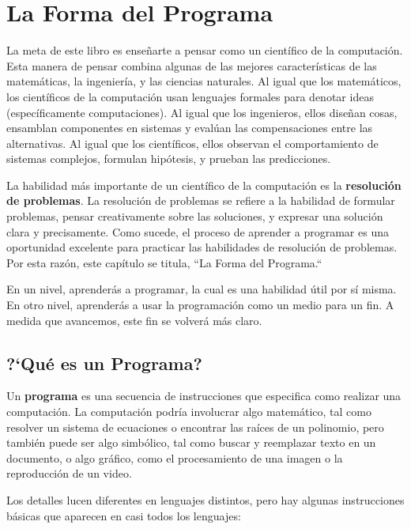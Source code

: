 \chapter{La Forma del Programa}

La meta de este libro es enseñarte a pensar como un científico de la 
computación. Esta manera de pensar combina algunas de las mejores características
de las matemáticas, la ingeniería, y las ciencias naturales. Al igual que los
matemáticos, los científicos de la computación usan lenguajes formales para denotar
ideas (específicamente computaciones). Al igual que los ingenieros, ellos diseñan cosas,
ensamblan componentes en sistemas y evalúan las compensaciones entre las alternativas.
Al igual que los científicos, ellos observan el comportamiento de sistemas complejos, 
formulan hipótesis, y prueban las predicciones. 

La habilidad más importante de un científico de la computación
es la {\bf resolución de problemas}. La resolución de problemas se refiere
a la habilidad de formular problemas, pensar creativamente sobre las
soluciones, y expresar una solución clara y precisamente. Como sucede, 
el proceso de aprender a programar es una oportunidad excelente para practicar 
las habilidades de resolución de problemas. Por esta razón, este capítulo se titula,
 ``La Forma del Programa.``

En un nivel, aprenderás a programar, la cual es una habilidad útil por sí misma.
En otro nivel, aprenderás a usar la programación como un medio para un fin. 
A medida que avancemos, este fin se volverá más claro.


\section{?`Qué es un Programa?}

Un {\bf programa} es una secuencia de instrucciones que especifica
como realizar una computación. La computación podría involucrar 
algo matemático, tal como resolver un sistema de ecuaciones o 
encontrar las raíces de un polinomio, pero también puede ser algo
simbólico, tal como buscar y reemplazar texto en un documento, o 
algo gráfico, como el procesamiento de una imagen o la reproducción 
de un video.

Los detalles lucen diferentes en lenguajes distintos, pero hay algunas
instrucciones básicas que aparecen en casi todos los lenguajes:

